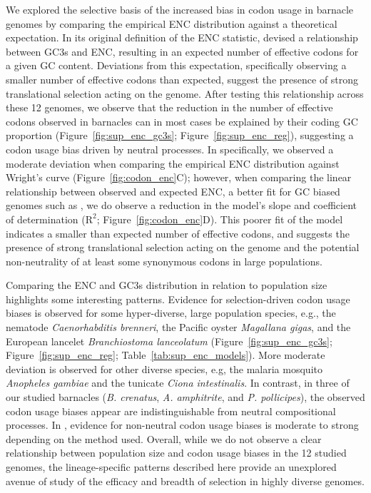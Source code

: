 We explored the selective basis of the increased bias in codon usage in barnacle genomes by
comparing the empirical ENC distribution against a theoretical expectation.
In its original definition of the ENC statistic, \citet{wright_effective_1990} devised a
relationship between GC3s and ENC, resulting in an expected number of effective codons for a
given GC content.
Deviations from this expectation, specifically observing a smaller number of effective codons
than expected, suggest the presence of strong translational selection acting on the genome.
After testing this relationship across these 12 genomes, we observe that the reduction in
the number of effective codons observed in barnacles can in most cases be explained by their
coding GC proportion (Figure~\ref{fig:sup_enc_gc3s}; Figure~\ref{fig:sup_enc_reg}), suggesting
a codon usage bias driven by neutral processes.
In \bgla{} specifically, we observed a moderate deviation when comparing the empirical ENC
distribution against Wright's curve (Figure~\ref{fig:codon_enc}C); however, when comparing the
linear relationship between observed and expected ENC, a better fit for GC biased genomes such
as \bgla{}, we do observe a reduction in the model's slope and coefficient of determination
($\text{R}^2$; Figure~\ref{fig:codon_enc}D).
This poorer fit of the model indicates a smaller than expected number of effective codons, and
suggests the presence of strong translational selection acting on the genome and the potential
non-neutrality of at least some synonymous codons in large \bgla{} populations.
\vspace{0.1cm}

Comparing the ENC and GC3s distribution in relation to population size highlights some
interesting patterns.
Evidence for selection-driven codon usage biases is observed for some hyper-diverse, large
population species, e.g., the nematode \textit{Caenorhabditis brenneri}, the Pacific oyster
\textit{Magallana gigas}, and the European lancelet \textit{Branchiostoma lanceolatum}
(Figure~\ref{fig:sup_enc_gc3s}; Figure~\ref{fig:sup_enc_reg}; Table~\ref{tab:sup_enc_models}).
More moderate deviation is observed for other diverse species, e.g, the malaria mosquito
\textit{Anopheles gambiae} and the tunicate \textit{Ciona intestinalis}.
In contrast, in three of our studied barnacles (\textit{B. crenatus}, \textit{A. amphitrite},
and \textit{P. pollicipes}), the observed codon usage biases appear are indistinguishable from
neutral compositional processes.
In \bgla{}, evidence for non-neutral codon usage biases is moderate to strong depending on the
method used.
Overall, while we do not observe a clear relationship between population size and codon usage
biases in the 12 studied genomes, the lineage-specific patterns described here provide an
unexplored avenue of study of the efficacy and breadth of selection in highly diverse genomes.

